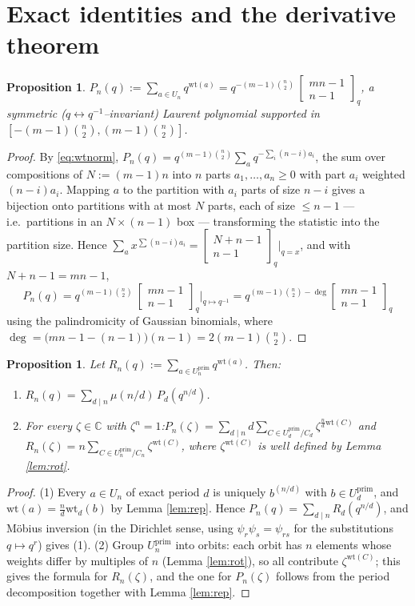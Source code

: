 \documentclass[11pt]{amsart}
\newtheorem{proposition}[theorem]{Proposition}
\theoremstyle{definition}
\newcommand{\CC}{\mathbb{C}}
\newcommand{\wt}{\mathrm{wt}}
\newcommand{\prim}{\mathrm{prim}}
\newcommand{\qbin}[2]{\begin{bmatrix}#1\\#2\end{bmatrix}_q}
\begin{document}
\section{Exact identities and the derivative theorem}\label{sec:exact}

\begin{proposition}\label{prop:P}
$P_n(q):=\sum_{a\in U_n}q^{\wt(a)}=q^{-(m-1)\binom n2}\,\qbin{mn-1}{n-1}$, a symmetric ($q\leftrightarrow q^{-1}$--invariant) Laurent polynomial supported in $[-(m-1)\binom n2,(m-1)\binom n2]$.
\end{proposition}

\begin{proof}
By \eqref{eq:wtnorm}, $P_n(q)=q^{(m-1)\binom n2}\sum_a q^{-\sum_i(n-i)a_i}$, the sum over compositions of $N:=(m-1)n$ into $n$ parts $a_1,\dots,a_n\ge0$ with part $a_i$ weighted $(n-i)a_i$. Mapping $a$ to the partition with $a_i$ parts of size $n-i$ gives a bijection onto partitions with at most $N$ parts, each of size $\le n-1$ --- i.e.\ partitions in an $N\times(n-1)$ box --- transforming the statistic into the partition size. Hence $\sum_a x^{\sum(n-i)a_i}=\qbin{N+n-1}{n-1}\big|_{q=x}$, and with $N+n-1=mn-1$,
\[
P_n(q)=q^{(m-1)\binom n2}\ \qbin{mn-1}{n-1}\Big|_{q\mapsto q^{-1}}
=q^{(m-1)\binom n2-\deg}\qbin{mn-1}{n-1}
\]
using the palindromicity of Gaussian binomials, where $\deg=\big(mn-1-(n-1)\big)(n-1)=2(m-1)\binom n2$.
\end{proof}

\begin{proposition}\label{prop:R}
Let $R_n(q):=\sum_{a\in U^{\prim}_n}q^{\wt(a)}$. Then:
\begin{enumerate}
\item $R_n(q)=\sum_{d\mid n}\mu(n/d)\,P_d(q^{n/d})$.
\item For every $\zeta\in\CC$ with $\zeta^n=1$:\quad $P_n(\zeta)=\sum_{d\mid n} d\!\!\sum_{C\in U_d^{\prim}/C_d}\!\!\zeta^{\frac nd \wt(C)}$ \quad and\quad $R_n(\zeta)=n\!\!\sum_{C\in U^{\prim}_n/C_n}\!\!\zeta^{\wt(C)}$,
where $\zeta^{\wt(C)}$ is well defined by Lemma \ref{lem:rot}.
\end{enumerate}
\end{proposition}

\begin{proof}
(1) Every $a\in U_n$ of exact period $d$ is uniquely $b^{(n/d)}$ with $b\in U^{\prim}_d$, and $\wt(a)=\frac nd\wt_d(b)$ by Lemma \ref{lem:rep}. Hence $P_n(q)=\sum_{d\mid n}R_d(q^{n/d})$, and M\"obius inversion (in the Dirichlet sense, using $\psi_{r}\psi_{s}=\psi_{rs}$ for the substitutions $q\mapsto q^r$) gives (1).
(2) Group $U^{\prim}_n$ into orbits: each orbit has $n$ elements whose weights differ by multiples of $n$ (Lemma \ref{lem:rot}), so all contribute $\zeta^{\wt(C)}$; this gives the formula for $R_n(\zeta)$, and the one for $P_n(\zeta)$ follows from the period decomposition together with Lemma \ref{lem:rep}.
\end{proof}
\end{document}
